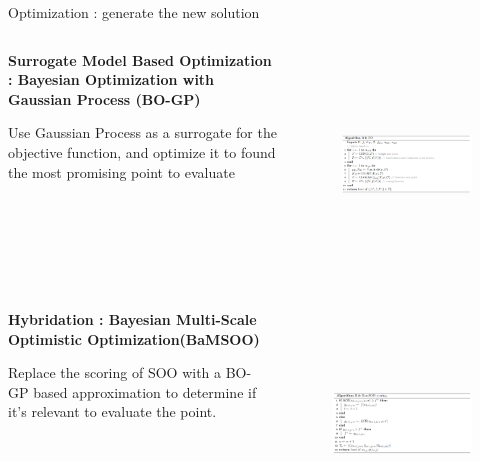 \begin{frame}[allowframebreaks]{Optimization : generate the new solution}
    \framebreak

    \begin{columns}
        \begin{column}{0.3\textwidth}
            \textbf{Surrogate Model Based Optimization : Bayesian Optimization with Gaussian Process (BO-GP)}

            Use Gaussian Process as a surrogate for the objective function, and optimize it to found the most promising point to evaluate
            
        \end{column}        
        \begin{column}{0.7\textwidth}
            \begin{figure}[h]
                \centering
                \includegraphics[height = 6cm]{imgs/algo/bo.png}
            \end{figure}
        \end{column}
    \end{columns}

    \framebreak

    \begin{columns}
        \begin{column}{0.3\textwidth}
            \textbf{Hybridation : Bayesian Multi-Scale Optimistic Optimization(BaMSOO)}

            Replace the scoring of SOO with a BO-GP based approximation to determine if it's relevant to evaluate the point.
            
        \end{column}        
        \begin{column}{0.7\textwidth}
            \begin{figure}[h]
                \centering
                \includegraphics[height = 6cm]{imgs/algo/bamsoo_score.png}
            \end{figure}
        \end{column}
    \end{columns}


\end{frame}
